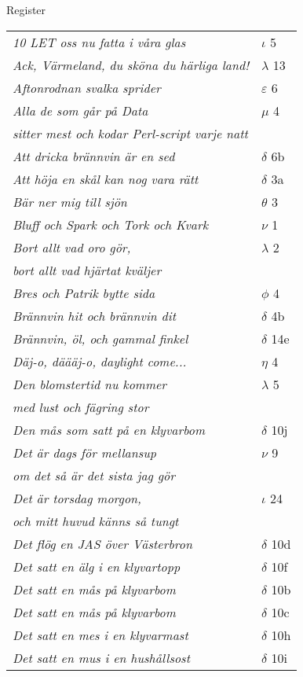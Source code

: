\documentclass[a6paper,10pt]{article}
\begin{document}
\noindent\Large Register
\begin{table}[!h]
\begin{tabular}{l l}
\textit{10 LET oss nu fatta i våra glas}	&$\iota$ 5\\
\textit{Ack, Värmeland, du sköna du härliga land!}	&$\lambda$ 13\\
\textit{Aftonrodnan svalka sprider}	&$\varepsilon$ 6\\
\textit{Alla de som går på Data}	&$\mu$ 4\\
\textit{sitter mest och kodar Perl-script varje natt}&\\
\textit{Att dricka brännvin är en sed}	&$\delta$ 6b\\
\textit{Att höja en skål kan nog vara rätt}	&$\delta$ 3a\\
\textit{Bär ner mig till sjön}	&$\theta$ 3\\
\textit{Bluff och Spark och Tork och Kvark}	&$\nu$ 1\\
\textit{Bort allt vad oro gör,}	&$\lambda$ 2\\
\textit{bort allt vad hjärtat kväljer}&\\
\textit{Bres och Patrik bytte sida}&$\phi$ 4\\
\textit{Brännvin hit och brännvin dit}	&$\delta$ 4b\\
\textit{Brännvin, öl, och gammal finkel}	&$\delta$ 14e\\
\textit{Däj-o, däääj-o, daylight come...}	&$\eta$ 4\\
\textit{Den blomstertid nu kommer}	&$\lambda$ 5\\
\textit{med lust och fägring stor}&\\
\textit{Den mås som satt på en klyvarbom}	&$\delta$ 10j\\
\textit{Det är dags för mellansup}	&$\nu$ 9\\
\textit{om det så är det sista jag gör}&\\
\textit{Det är torsdag morgon,}&$\iota$ 24\\
\textit{och mitt huvud känns så tungt}&\\
\textit{Det flög en JAS över Västerbron}	&$\delta$ 10d\\
\textit{Det satt en älg i en klyvartopp}	&$\delta$ 10f\\
\textit{Det satt en mås på klyvarbom}	&$\delta$ 10b\\
\textit{Det satt en mås på klyvarbom}	&$\delta$ 10c\\
\textit{Det satt en mes i en klyvarmast}	&$\delta$ 10h\\
\textit{Det satt en mus i en hushållsost}	&$\delta$ 10i\\
\end{tabular}
\end{table}
\end{document}

